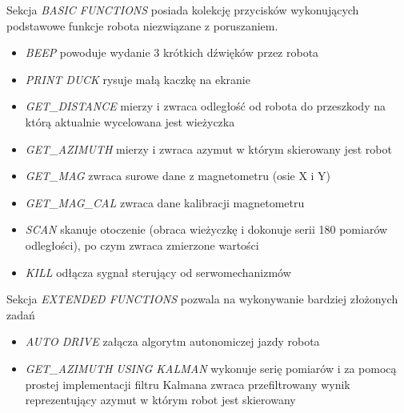 Sekcja \emph{BASIC FUNCTIONS} posiada kolekcję przycisków wykonujących podstawowe funkcje robota niezwiązane z poruszaniem.
\begin{itemize}
    \item \emph{BEEP} powoduje wydanie 3 krótkich dźwięków przez robota
    \item \emph{PRINT DUCK} rysuje małą kaczkę na ekranie
    \item \emph{GET\_DISTANCE} mierzy i zwraca odległość od robota do przeszkody na którą aktualnie wycelowana jest wieżyczka
    \item \emph{GET\_AZIMUTH} mierzy i zwraca azymut w którym skierowany jest robot
    \item \emph{GET\_MAG} zwraca surowe dane z magnetometru (osie X i Y)
    \item \emph{GET\_MAG\_CAL} zwraca dane kalibracji magnetometru
    \item \emph{SCAN} skanuje otoczenie (obraca wieżyczkę i dokonuje serii 180 pomiarów odległości), po czym zwraca zmierzone wartości
    \item \emph{KILL} odłącza sygnał sterujący od serwomechanizmów
\end{itemize}

Sekcja \emph{EXTENDED FUNCTIONS} pozwala na wykonywanie bardziej złożonych zadań
\begin{itemize}
    \item \emph{AUTO DRIVE} załącza algorytm autonomiczej jazdy robota
    \item \emph{GET\_AZIMUTH USING KALMAN} wykonuje serię pomiarów i za pomocą prostej implementacji filtru Kalmana\cite{Kedzierski2016} zwraca przefiltrowany wynik reprezentujący azymut w którym robot jest skierowany
\end{itemize}

